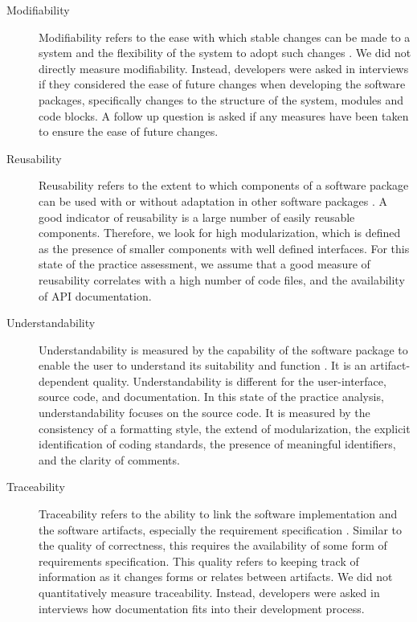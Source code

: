 \documentclass[final, 3p, times, authoryear]{elsarticle}
\begin{document}
\begin{description}
	\item[Modifiability] Modifiability refers to the ease with which stable
	changes can be made to a system and the flexibility of the system to adopt
	such changes \citep{8016712}. We did not directly measure modifiability.
	Instead, developers were asked in interviews if they considered the ease of
	future changes when developing the software packages, specifically changes
	to the structure of the system, modules and code blocks. A follow up
	question is asked if any measures have been taken to ensure the ease of
	future changes.
	
	\item[Reusability] Reusability refers to the extent to which components of a
	software package can be used with or without adaptation in other software
	packages \citep{kalagiakos2003non}. A good indicator of reusability is a
	large number of easily reusable components. Therefore, we look for high
	modularization, which is defined as the presence of smaller components with
	well defined interfaces. For this state of the practice assessment, we
	assume that a good measure of reusability correlates with a high
	number of code files, and the availability of API documentation.
	
	\item[Understandability] Understandability is measured by the capability of
	the software package to enable the user to understand its suitability and
	function \citep{ISO9126}. It is an artifact-dependent quality.
	Understandability is different for the user-interface, source code, and
	documentation. In this state of the practice analysis, understandability
	focuses on the source code. It is measured by the consistency of a
	formatting style, the extend of modularization, the explicit identification
	of coding standards, the presence of meaningful identifiers, and the clarity
	of comments. 
	
	\item[Traceability] Traceability refers to the ability to link the software
	implementation and the software artifacts, especially the requirement
	specification \citep{McCallEtAl1977}. Similar to the quality of correctness,
	this requires the availability of some form of requirements specification.
	This quality refers to keeping track of information as it changes forms or
	relates between artifacts. We did not quantitatively measure traceability.
	Instead, developers were asked in interviews how documentation fits into
	their development process.
	

\end{description}
\end{document}
